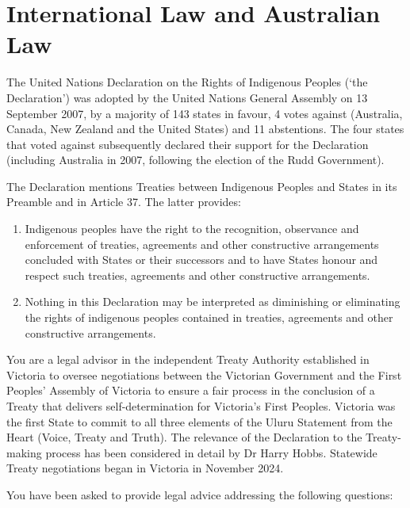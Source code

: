 \section{International Law and Australian Law}
\begin{tutorialquestion}
    \flushleft

    The United Nations Declaration on the Rights of Indigenous Peoples (`the Declaration') was adopted by the United Nations General Assembly on 13 September 2007, by a majority of 143 states in favour, 4 votes against (Australia, Canada, New Zealand and the United States) and 11 abstentions. The four states that voted against subsequently declared their support for the Declaration (including Australia in 2007, following the election of the Rudd Government).
    
    \vspace{\baselineskip}

    The Declaration mentions Treaties between Indigenous Peoples and States in its Preamble and in Article 37. The latter provides:
    \begin{enumerate}
        \item Indigenous peoples have the right to the recognition, observance and enforcement of treaties, agreements and other constructive arrangements concluded with States or their successors and to have States honour and respect such treaties, agreements and other constructive arrangements.
        \item Nothing in this Declaration may be interpreted as diminishing or eliminating the rights of indigenous peoples contained in treaties, agreements and other constructive arrangements.
    \end{enumerate}

    You are a legal advisor in the independent Treaty Authority established in Victoria to oversee negotiations between the Victorian Government and the First Peoples’ Assembly of Victoria to ensure a fair process in the conclusion of a Treaty that delivers self-determination for Victoria’s First Peoples. Victoria was the first State to commit to all three elements of the Uluru Statement from the Heart (Voice, Treaty and Truth). The relevance of the Declaration to the Treaty-making process has been considered in detail by Dr Harry Hobbs. Statewide Treaty negotiations began in Victoria in November 2024.

    \vspace{\baselineskip}

    You have been asked to provide legal advice addressing the following questions:


\end{tutorialquestion}
